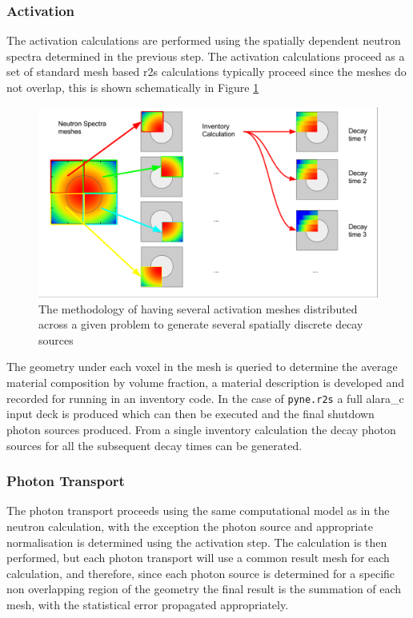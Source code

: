 \documentclass[12pt]{article}
\begin{document}
\subsubsection{Activation}
The activation calculations are performed using the spatially dependent neutron
spectra determined in the previous step. The activation calculations proceed as
a set of standard mesh based \gls{r2s} calculations typically proceed since the 
meshes do not overlap, this is shown schematically in Figure
\ref{fig:activation_method}
\begin{figure}[ht!]
  \centering
  \includegraphics[scale=0.3]{../plots/method/activation_method.png}
  \caption{The methodology of having several activation meshes distributed
           across a given problem to generate several spatially discrete
           decay sources}
  \label{fig:activation_method}
\end{figure}
The geometry under each voxel in the mesh is queried to 
determine the average material composition by volume fraction, a material 
description is developed and recorded for running in an inventory code. In the 
case of \texttt{pyne.r2s} a full \gls{alara_c} input deck is produced which can
then be executed and the final shutdown photon sources produced. From a single
inventory calculation the decay photon sources for all the subsequent decay
times can be generated.  
\subsubsection{Photon Transport}
The photon transport proceeds using the same computational model as in the 
neutron calculation, with the exception the photon source and appropriate 
normalisation is determined using the activation step. The calculation is then
performed, but each photon transport will use a common result mesh for each 
calculation, and therefore, since each photon source is determined for a 
specific non overlapping region of the geometry the final result is the 
summation of each mesh, with the statistical error propagated appropriately.
\end{document}
